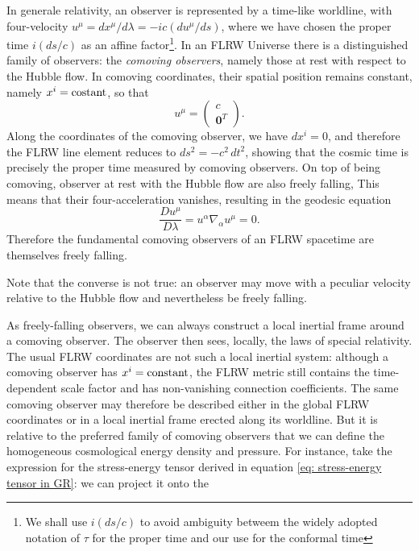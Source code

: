 In generale relativity, an observer is represented by a time-like worldline, with four-velocity $u^\mu = dx^\mu/d\lambda = -ic(du^\mu/ds)$, where we have chosen the proper time $i(ds/c)$ as an affine factor\footnote{We shall use $i(ds/c)$ to avoid ambiguity betweem the widely adopted notation of $\tau$ for the proper time and our use for the conformal time}. In an FLRW Universe there is a distinguished family of observers: the \emph{comoving observers}, namely those at rest with respect to the Hubble flow. In comoving coordinates, their spatial position remains constant, namely $x^i = \mathrm{costant}$, so that 
\begin{equation}
    u^\mu = 
    \begin{pmatrix}
        c \\
        \bm{0}^T
    \end{pmatrix}.
\end{equation}
Along the coordinates of the comoving observer, we have $dx^i = 0$, and therefore the FLRW line element reduces to $ds^2 = -c^2\,dt^2$, showing that the cosmic time is precisely the proper time measured by comoving observers. On top of being comoving, observer at rest with the Hubble flow are also freely falling, This means that their four-acceleration vanishes, resulting in the geodesic equation 
\begin{equation}
    \frac{D u^\mu}{D\lambda} = u^\alpha\nabla_\alpha u^\mu = 0.
\end{equation}
Therefore the fundamental comoving observers of an FLRW spacetime are themselves freely falling.
\begin{obs}
    Note that the converse is not true: an observer may move with a peculiar velocity relative to the
Hubble flow and nevertheless be freely falling.
\end{obs}
As freely-falling observers, we can always construct a local inertial frame around a comoving observer. The observer then sees, locally, the laws of special relativity. The usual FLRW coordinates are not such a local inertial system: although a comoving observer has $x^i = \mathrm{constant}$, the FLRW metric still contains the time-dependent scale factor and has non-vanishing connection coefficients. The same comoving observer may therefore be described either in the global FLRW coordinates or in a local inertial frame erected along its worldline. But it is relative to the preferred family of comoving observers that we can define the homogeneous cosmological energy density and pressure.
For instance, take the expression for the stress-energy tensor derived in equation \eqref{eq: stress-energy tensor in GR}: we can project it onto the
